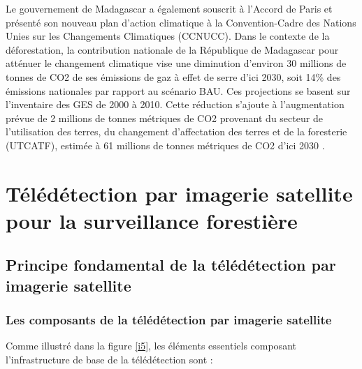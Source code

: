Le gouvernement de Madagascar a également souscrit à l'Accord de Paris et présenté son nouveau plan d'action climatique à la Convention-Cadre des Nations Unies sur les Changements Climatiques (CCNUCC). Dans le contexte de la déforestation, la contribution nationale de la République de Madagascar pour atténuer le changement climatique vise une diminution d'environ 30 millions de tonnes de CO2 de ses émissions de gaz à effet de serre d'ici 2030, soit 14\% des émissions nationales par rapport au scénario BAU. Ces projections se basent sur l'inventaire des GES de 2000 à 2010. Cette réduction s'ajoute à l'augmentation prévue de 2 millions de tonnes métriques de CO2 provenant du secteur de l'utilisation des terres, du changement d'affectation des terres et de la foresterie (UTCATF), estimée à 61 millions de tonnes métriques de CO2 d'ici 2030 \cite{30}.

\section{Télédétection par imagerie satellite pour la surveillance forestière} 
\subsection{Principe fondamental de la télédétection par imagerie satellite}
\subsubsection{Les composants de la télédétection par imagerie satellite}
Comme illustré dans la figure \ref{i5}, les éléments essentiels composant l'infrastructure de base de la télédétection sont \cite{31} :
\\

